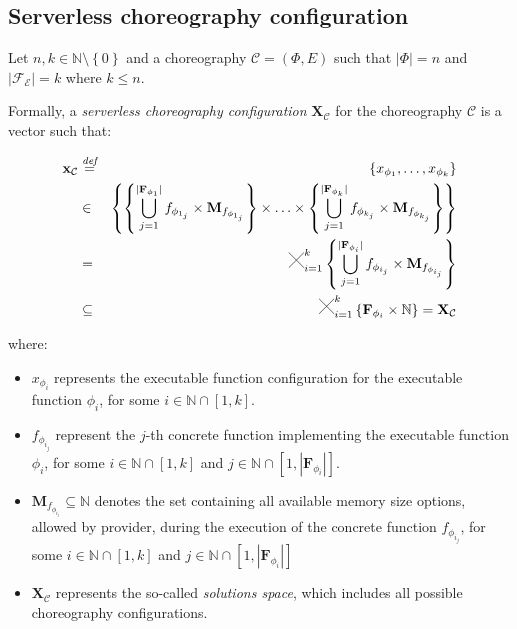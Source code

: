\documentclass[12pt,a4paper]{report}
\newcommand{\Cross}{\mathbin{\tikz [x=2.5ex,y=2.5ex,line width=.10ex] \draw (0,0) -- (1,1) (0,1) -- (1,0);}}
\newcommand{\mathDef}{\overset{\textit{def}}{=}}
\newcommand{\N}{\mathbb{N}}
\begin{document}
\subsection{Serverless choreography configuration}

Let $n,k \in \N \setminus \left\lbrace 0 \right\rbrace$ and a choreography $\mathcal{C} = (\Phi,E)$ such that $|\Phi| = n$ and $|\mathscr{F_E}| = k$ where $k \leq n$.

Formally, a \textit{serverless choreography configuration} $\textbf{X}_{\mathcal{C}}$ for the choreography $\mathcal{C}$ is a vector such that:

\begin{eqnarray}
	\textbf{x}_{\mathcal{C}} & \mathDef & \left\lbrace x_{\phi_{1}}, \ldots, x_{\phi_{k}} \right\rbrace \nonumber \\ 
	& \in & \left\{  \left\{ \bigcup_{j=1}^{|\textbf{F}_{\phi_{1}}|} f_{\phi_{1_j}} \times \textbf{M}_{f_{\phi_{1_j}}} \right\} \times \ldots \times \left\{ \bigcup_{j=1}^{|\textbf{F}_{\phi_{k}}|} f_{\phi_{k_j}} \times \textbf{M}_{f_{\phi_{k_j}}} \right\} \right\}  \nonumber \\
	& = & \Cross_{i = 1}^k \left\{ \bigcup_{j=1}^{|\textbf{F}_{\phi_{i}}|} f_{\phi_{i_j}} \times \textbf{M}_{f_{\phi_{i_j}}} \right\} \nonumber \\
	& \subseteq & \Cross_{i = 1}^k \left\{ \textbf{F}_{\phi_{i}} \times \mathbb{N} \right\} = \textbf{X}_{\mathcal{C}}
\end{eqnarray}

where:

\begin{itemize}
	\item $x_{\phi_{i}}$ represents the executable function configuration for the executable function $\phi_{i}$, for some  $i \in \N \cap \left[ 1, k \right]$.
	
	\item $f_{\phi_{i_j}}$ represent the $j$-th concrete function implementing the executable function $\phi_{i}$, for some  $i \in \N \cap \left[ 1, k \right]$ and $j \in \N \cap \left[ 1, |\textbf{F}_{\phi_{i}}| \right]$.
	
	\item $\textbf{M}_{f_{\phi_{i_j}}} \subseteq \N$ denotes the set containing all available memory size options, allowed by provider, during the execution of the concrete function $f_{\phi_{i_j}}$, for some $i \in \N \cap \left[ 1, k \right]$ and $j \in \N \cap \left[ 1, |\textbf{F}_{\phi_{i}}| \right]$
	
	\item $\textbf{X}_{\mathcal{C}}$ represents the so-called \textit{solutions space}, which includes all possible choreography configurations.
	
	
\end{itemize}
\end{document}
